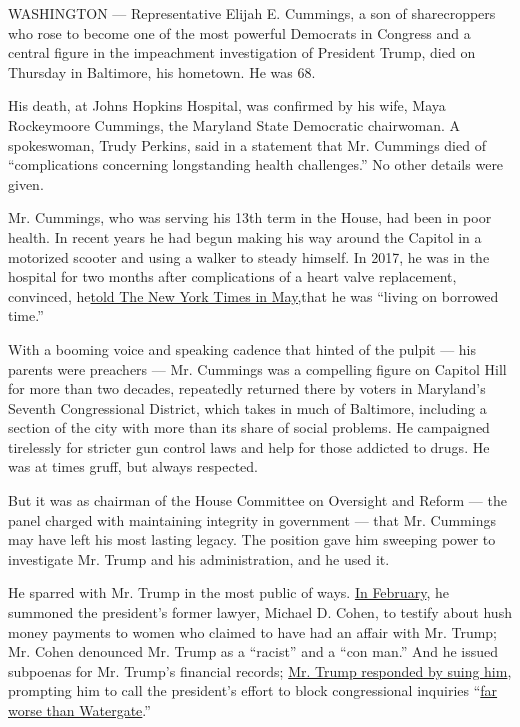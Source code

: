 WASHINGTON --- Representative Elijah E. Cummings, a son of sharecroppers
who rose to become one of the most powerful Democrats in Congress and a
central figure in the impeachment investigation of President Trump, died
on Thursday in Baltimore, his hometown. He was 68.

His death, at Johns Hopkins Hospital, was confirmed by his wife, Maya
Rockeymoore Cummings, the Maryland State Democratic chairwoman. A
spokeswoman, Trudy Perkins, said in a statement that Mr. Cummings died
of ``complications concerning longstanding health challenges.'' No other
details were given.

Mr. Cummings, who was serving his 13th term in the House, had been in
poor health. In recent years he had begun making his way around the
Capitol in a motorized scooter and using a walker to steady himself. In
2017, he was in the hospital for two months after complications of a
heart valve replacement, convinced,
he\href{https://www.nytimes.com/2019/05/08/us/politics/elijah-cummings-trump-impeachment.html?rref=collection\%2Fbyline\%2Fsheryl-gay-stolberg\&action=click\&contentCollection=undefined\&region=stream\&module=stream_unit\&version=search\&contentPlacement=2\&pgtype=collection}{told
The New York Times in May,}that he was ``living on borrowed time.''

With a booming voice and speaking cadence that hinted of the pulpit ---
his parents were preachers --- Mr. Cummings was a compelling figure on
Capitol Hill for more than two decades, repeatedly returned there by
voters in Maryland's Seventh Congressional District, which takes in much
of Baltimore, including a section of the city with more than its share
of social problems. He campaigned tirelessly for stricter gun control
laws and help for those addicted to drugs. He was at times gruff, but
always respected.

But it was as chairman of the House Committee on Oversight and Reform
--- the panel charged with maintaining integrity in government --- that
Mr. Cummings may have left his most lasting legacy. The position gave
him sweeping power to investigate Mr. Trump and his administration, and
he used it.

He sparred with Mr. Trump in the most public of ways.
\href{https://www.nytimes.com/2019/02/26/us/politics/michael-cohen-trump-congress.html}{In
February}, he summoned the president's former lawyer, Michael D. Cohen,
to testify about hush money payments to women who claimed to have had an
affair with Mr. Trump; Mr. Cohen denounced Mr. Trump as a ``racist'' and
a ``con man.'' And he issued subpoenas for Mr. Trump's financial
records;
\href{https://www.nytimes.com/2019/04/22/us/politics/trump-sues-congress.html}{Mr.
Trump responded by suing him}, prompting him to call the president's
effort to block congressional inquiries
``\href{https://www.nytimes.com/2019/05/08/us/politics/elijah-cummings-trump-impeachment.html}{far
worse than Watergate}.''

